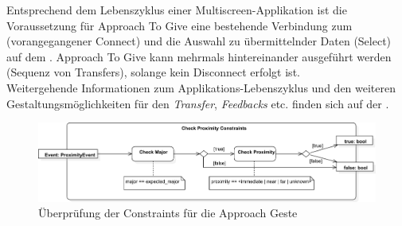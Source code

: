 {Entsprechend dem Lebenszyklus einer Multiscreen-Applikation ist die Voraussetzung
für Approach To Give eine bestehende Verbindung zum \recdev{} (vorangegangener Connect) und die Auswahl zu übermittelnder Daten (Select) auf dem \sendev{}. Approach To Give kann mehrmals hintereinander ausgeführt werden (Sequenz von Transfers), solange kein Disconnect erfolgt ist.\\

Weitergehende Informationen zum Applikations-Lebenszyklus und den weiteren
Gestaltungsmöglichkeiten für den \textit{Transfer}, \textit{Feedbacks} etc. finden sich
auf der \developerpage.

\begin{figure}[h]
\includegraphics[width=\textwidth]{approach_check_constraints.png}
\caption{Überprüfung der Constraints für die Approach Geste}
\label{check_approach_constraints}
\end{figure}
}


\newcommand{\authors}{Horst Schneider, Hochschule Mannheim\\
Dominick Madden, Hochschule Mannheim\\
Valentina Burjan, Hochschule Mannheim}
\newcommand{\versionhistory}{13.09.2016}
\newcommand{\dateofcreation}{15.08.2016}
\newcommand{\comments}{...}
\newcommand{\questions}{...}



